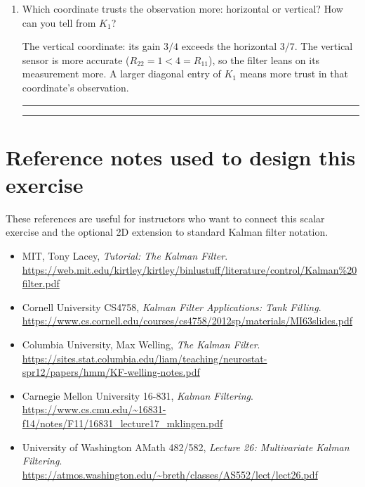\documentclass[11pt]{article}
\newcommand{\blankline}{\vspace{0.9em}\hrule\vspace{0.9em}}
\begin{document}
\begin{enumerate}
  \item Which coordinate trusts the observation more: horizontal or vertical?
  How can you tell from $K_1$?

  \begin{solution}
  The vertical coordinate: its gain $3/4$ exceeds the horizontal $3/7$. The
  vertical sensor is more accurate ($R_{22}=1<4=R_{11}$), so the filter leans
  on its measurement more. A larger diagonal entry of $K_1$ means more trust in
  that coordinate's observation.
  \end{solution}

  \blankline
  \blankline
\end{enumerate}

\newpage

\section*{Reference notes used to design this exercise}

These references are useful for instructors who want to connect this scalar
exercise and the optional 2D extension to standard Kalman filter notation.

\begin{itemize}
  \item MIT, Tony Lacey, \emph{Tutorial: The Kalman Filter}.\\
  \url{https://web.mit.edu/kirtley/kirtley/binlustuff/literature/control/Kalman%20filter.pdf}

  \item Cornell University CS4758, \emph{Kalman Filter Applications: Tank Filling}.\\
  \url{https://www.cs.cornell.edu/courses/cs4758/2012sp/materials/MI63slides.pdf}

  \item Columbia University, Max Welling, \emph{The Kalman Filter}.\\
  \url{https://sites.stat.columbia.edu/liam/teaching/neurostat-spr12/papers/hmm/KF-welling-notes.pdf}

  \item Carnegie Mellon University 16-831, \emph{Kalman Filtering}.\\
  \url{https://www.cs.cmu.edu/~16831-f14/notes/F11/16831_lecture17_mklingen.pdf}

  \item University of Washington AMath 482/582, \emph{Lecture 26: Multivariate Kalman Filtering}.\\
  \url{https://atmos.washington.edu/~breth/classes/AS552/lect/lect26.pdf}
\end{itemize}
\end{document}
